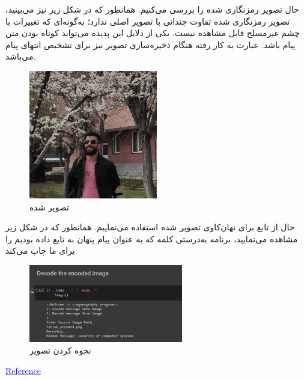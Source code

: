حال تصویر رمزنگاری شده را بررسی می‌کنیم. همانطور که در شکل زیر نیز می‌بینید، تصویر رمزنگاری شده تفاوت چندانی با تصویر اصلی ندارد؛ به‌گونه‌ای که تغییرات با چشم غیرمسلح قابل مشاهده نیست. یکی از دلایل این پدیده می‌تواند کوتاه بودن متن پیام باشد. عبارت  به کار رفته هنگام ذخیره‌سازی تصویر نیز برای تشخیص انتهای پیام می‌باشد.
\begin{figure}[H]
  \centering
  \includegraphics[width=0.5\textwidth]{Images/farzan_encoded.png}
  \caption{تصویر  شده}   
\end{figure}
حال از تابع  برای نهان‌کاوی تصویر  شده استفاده می‌نماییم. همانطور که در شکل زیر مشاهده می‌نمایید، برنامه به‌درستی کلمه  که به عنوان پیام پنهان به تابع  داده بودیم را برای ما چاپ می‌کند.
\begin{figure}[H]
  \centering
  \includegraphics[width=0.6\textwidth]{Images/q1_2.JPG}
  \caption{نحوه  کردن تصویر}   
\end{figure}
\begin{latin}
\href{https://medium.com/swlh/lsb-image-steganography-using-python-2bbbee2c69a2}{\textcolor{blue}{Reference}}
\end{latin}